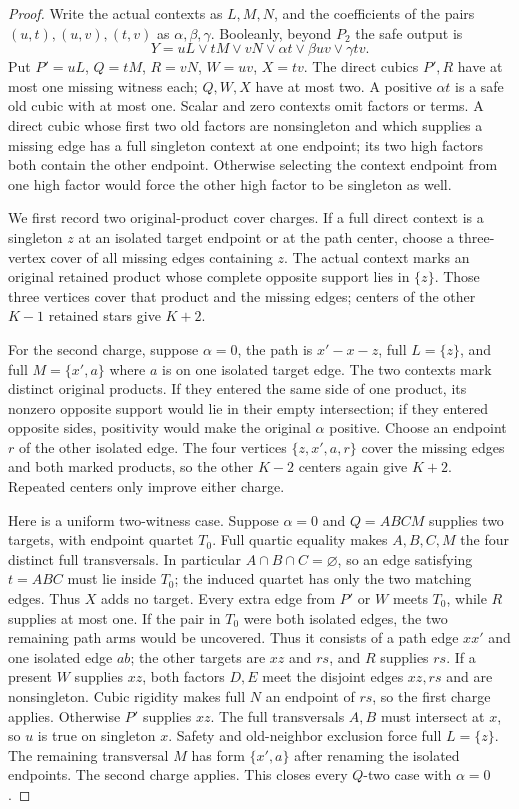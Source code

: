 \documentclass[11pt]{article}
\theoremstyle{definition}
\theoremstyle{remark}
\begin{document}
\begin{proof}
Write the actual contexts as $L,M,N$, and the coefficients of the pairs $(u,t),(u,v),(t,v)$ as $\alpha,\beta,\gamma$. Booleanly, beyond $P_2$ the safe output is
\[
 Y=uL\vee tM\vee vN\vee\alpha t\vee\beta uv\vee\gamma tv.
\]
Put $P'=uL$, $Q=tM$, $R=vN$, $W=uv$, $X=tv$. The direct cubics $P',R$ have at most one missing witness each; $Q,W,X$ have at most two. A positive $\alpha t$ is a safe old cubic with at most one. Scalar and zero contexts omit factors or terms. A direct cubic whose first two old factors are nonsingleton and which supplies a missing edge has a full singleton context at one endpoint; its two high factors both contain the other endpoint. Otherwise selecting the context endpoint from one high factor would force the other high factor to be singleton as well.

We first record two original-product cover charges. If a full direct context is a singleton $z$ at an isolated target endpoint or at the path center, choose a three-vertex cover of all missing edges containing $z$. The actual context marks an original retained product whose complete opposite support lies in $\{z\}$. Those three vertices cover that product and the missing edges; centers of the other $K-1$ retained stars give $K+2$.

For the second charge, suppose $\alpha=0$, the path is $x'-x-z$, full $L=\{z\}$, and full $M=\{x',a\}$ where $a$ is on one isolated target edge. The two contexts mark distinct original products. If they entered the same side of one product, its nonzero opposite support would lie in their empty intersection; if they entered opposite sides, positivity would make the original $\alpha$ positive. Choose an endpoint $r$ of the other isolated edge. The four vertices $\{z,x',a,r\}$ cover the missing edges and both marked products, so the other $K-2$ centers again give $K+2$. Repeated centers only improve either charge.

Here is a uniform two-witness case. Suppose $\alpha=0$ and $Q=ABCM$ supplies two targets, with endpoint quartet $T_0$. Full quartic equality makes $A,B,C,M$ the four distinct full transversals. In particular $A\cap B\cap C=\varnothing$, so an edge satisfying $t=ABC$ must lie inside $T_0$; the induced quartet has only the two matching edges. Thus $X$ adds no target. Every extra edge from $P'$ or $W$ meets $T_0$, while $R$ supplies at most one. If the pair in $T_0$ were both isolated edges, the two remaining path arms would be uncovered. Thus it consists of a path edge $xx'$ and one isolated edge $ab$; the other targets are $xz$ and $rs$, and $R$ supplies $rs$. If a present $W$ supplies $xz$, both factors $D,E$ meet the disjoint edges $xz,rs$ and are nonsingleton. Cubic rigidity makes full $N$ an endpoint of $rs$, so the first charge applies. Otherwise $P'$ supplies $xz$. The full transversals $A,B$ must intersect at $x$, so $u$ is true on singleton $x$. Safety and old-neighbor exclusion force full $L=\{z\}$. The remaining transversal $M$ has form $\{x',a\}$ after renaming the isolated endpoints. The second charge applies. This closes every $Q$-two case with $\alpha=0$.


\end{proof}
\end{document}
